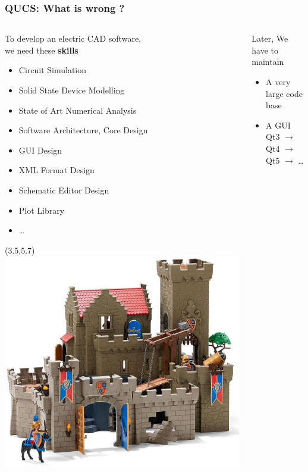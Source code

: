 \begin{frame}
  \frametitle{QUCS: What is wrong ?}
  \begin{columns}
    \begin{column}[t]{.5\textwidth}
      To develop an electric CAD software, \\
      we need these \textbf{skills} %
      {\footnotesize
        \begin{itemize}
        \item Circuit Simulation
        \item Solid State Device Modelling
        \item State of Art Numerical Analysis
        \item Software Architecture, Core Design
        \item GUI Design
        \item XML Format Design
        \item Schematic Editor Design
        \item Plot Library
        \item \ldots
        \end{itemize}%
      }
      \begin{textblock}{6}(3.5,5.7) %
        \includegraphics[width=.55\textwidth]{images/playmobil-t.png}
      \end{textblock}
    \end{column}
    \begin{column}[t]{.5\textwidth}
      Later, We have to \alert{maintain} \\[.5em]
      \begin{itemize}
        \item A very large code base
        \item A GUI Qt3 $\rightarrow$ Qt4 $\rightarrow$ Qt5 $\rightarrow$ \ldots \\[1em]
      \end{itemize}

\end{column}
\end{columns}
\end{frame}
